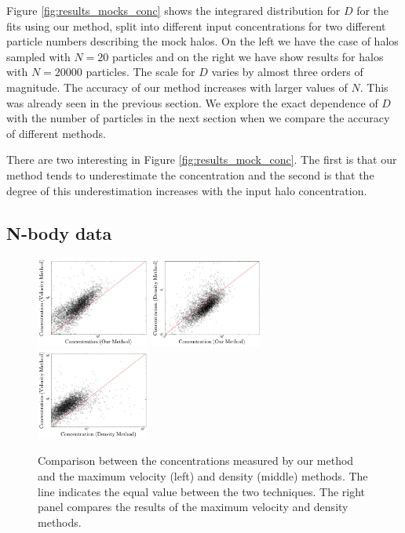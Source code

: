 \documentclass{emulateapj}
\begin{document}
Figure \ref{fig:results_mocks_conc} shows the integrared distribution
for $D$ for the fits using our method, split into different input
concentrations for two different particle numbers describing the mock
halos. 
On the left we have the case of halos sampled with $N=20$ particles
and on the right we have show results for halos with $N=20000$
particles. 
The scale for $D$ varies by almost three orders of magnitude.
The accuracy of our method increases with larger values of $N$. 
This was already seen in the previous section. 
We explore the exact dependence of $D$ with the number of particles in
the next section when we compare the accuracy of different methods.

There are two interesting in Figure \ref{fig:results_mock_conc}. The
first is that our method tends to underestimate the concentration
and the second is that the degree of this underestimation increases
with the input halo concentration.



\subsection{N-body data}
\label{sec:data}
\begin{figure}
  \begin{center}
    \includegraphics[width=0.33\textwidth]{mass-velocity.pdf}
    \includegraphics[width=0.33\textwidth]{mass-density.pdf}
    \includegraphics[width=0.33\textwidth]{density-velocity.pdf}
  \end{center}
  \caption{Comparison between the concentrations measured by our
    method and the maximum velocity (left) and density (middle)
    methods. The line indicates the equal value between the two
    techniques. The right panel compares the results of the maximum
    velocity and density methods.
  \label{fig:mdv}}
\end{figure}
\end{document}
